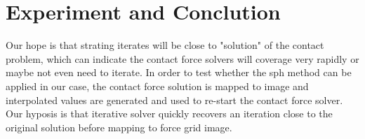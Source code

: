 \section{Experiment and Conclution}
    Our hope is that strating iterates will be close to "solution" of the contact problem, which can indicate the contact force solvers will coverage very rapidly or maybe not even need to iterate. In order to test whether the sph method can be applied in our case, the contact force solution is mapped to image and interpolated values are generated and used to re-start the contact force solver. Our hyposis is that iterative solver quickly recovers an iteration close to the original solution before mapping to force grid image.